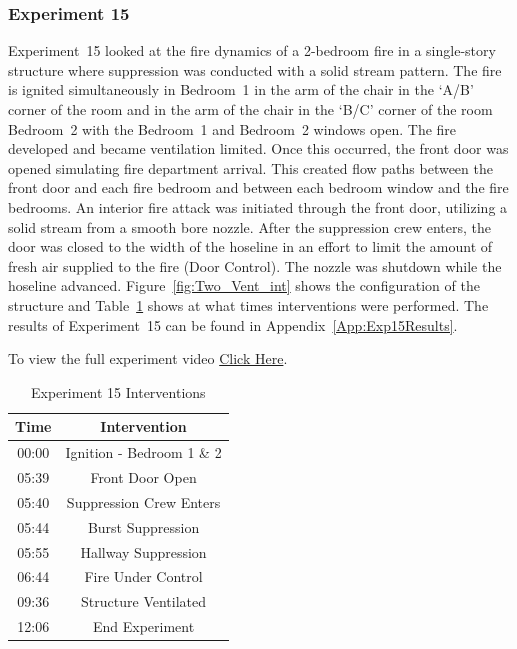 \documentclass[12pt,oneside]{book}
\begin{document}
\subsubsection{Experiment 15}
Experiment~15 looked at the fire dynamics of a 2-bedroom fire in a single-story structure where suppression was conducted with a solid stream pattern. The fire is ignited simultaneously in Bedroom~1 in the arm of the chair in the `A/B' corner of the room and in the arm of the chair in the `B/C' corner of the room Bedroom~2 with the Bedroom~1 and Bedroom~2 windows open. The fire developed and became ventilation limited. Once this occurred, the front door was opened simulating fire department arrival. This created flow paths between the front door and each fire bedroom and between each bedroom window and the fire bedrooms. An interior fire attack was initiated through the front door, utilizing a solid stream from a smooth bore nozzle. After the suppression crew enters, the door was closed to the width of the hoseline in an effort to limit the amount of fresh air supplied to the fire (Door Control). The nozzle was shutdown while the hoseline advanced. Figure~\ref{fig:Two_Vent_int} shows the configuration of the structure and Table~\ref{Table:Exp15Interventions} shows at what times interventions were performed. The results of Experiment~15 can be found in Appendix~\ref{App:Exp15Results}. 

To view the full experiment video \href{https://player.vimeo.com/video/170499619?autoplay=1}{Click Here}.

\begin{table}[H]
	\centering
	\caption{Experiment 15 Interventions}
	\begin{tabular}{|c|c|} 
		\hline
		Time & Intervention \\ \hline \hline
		00:00 & Ignition - Bedroom 1 \& 2 \\ \hline
		05:39 & Front Door Open \\ \hline
		05:40 & Suppression Crew Enters\\ \hline
		05:44 & Burst Suppression \\ \hline 
		05:55 & Hallway Suppression \\ \hline
		06:44 & Fire Under Control 	\\ \hline
		09:36 & Structure Ventilated \\ \hline
		12:06 & End Experiment\\ \hline
	\end{tabular}
	\label{Table:Exp15Interventions}
\end{table}
\end{document}
